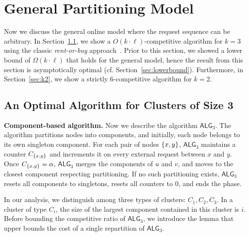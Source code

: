 \documentclass[a4paper,anonymous,USenglish]{lipics-v2019}
\newcommand{\OPT}{\textsf{OPT}\xspace}
\newcommand{\OBRP}{BRP\xspace}
\newcommand{\TAlg}{{\ensuremath{\textsf{ALG}_{3}}}\xspace}
\DeclarePairedDelimiter\set{\{}{\}}
\begin{document}

\section{General Partitioning Model}
\label{sec:part}


Now  we discuss the general online
model where the request sequence
can be arbitrary.
In Section~\ref{sec:k3}, we show a $O(k \cdot \ell)$-competitive algorithm for $k=3$ using the classic \emph{rent-or-buy} approach~\cite{karlin-ski-rental}.
Prior to this section, we showed a lower bound of $\Omega(k \cdot \ell)$  that holds for the general model, hence the result from this section is asymptotically optimal (cf. Section~\ref{sec:lowerbound}).
Furthermore, in Section~\ref{sec:k2}, we show a strictly $6$-competitive algorithm for $k=2$.



\subsection{An Optimal Algorithm for Clusters of Size 3}
\label{sec:k3}




\noindent
\textbf{Component-based algorithm.}
Now we describe the algorithm \TAlg.
The algorithm partitions nodes into components, and
initially, each node belongs to its own singleton component.
For each pair of nodes $\set{x,y}$, \TAlg maintains a counter $C_{\set{x,y}}$ and increments it on every external request between $x$ and $y$.
Once $C_{\set{x,y}} = \alpha$, \TAlg merges the components of $u$ and $v$, and moves to the closest component respecting partitioning.
If no such partitioning exists, \TAlg resets all components to singletons, resets all counters to $0$, and ends the phase.



In our analysis, we distinguish among three types of clusters: $C_1, C_2, C_3$. In a cluster of type $C_i$, the size of the largest component contained in this cluster is $i$.
Before bounding the competitive ratio of \TAlg, we introduce the lemma that upper bounds the cost of a single repartition of \TAlg.
\end{document}
